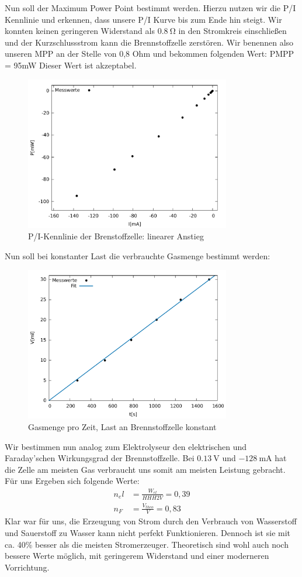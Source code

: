 Nun soll der Maximum Power Point bestimmt werden. Hierzu nutzen wir die P/I Kennlinie und erkennen, dass unsere P/I Kurve bis zum Ende hin steigt. Wir konnten keinen geringeren Widerstand als $\SI{0,8}{\ohm}$  in den Stromkreis einschließen und der Kurzschlussstrom kann die Brennstoffzelle zerstören. Wir benennen also unseren MPP an der Stelle von 0,8 Ohm und bekommen folgenden Wert: PMPP = 95mW 
Dieser Wert ist akzeptabel.
\begin{figure}[htbp]
	\centering
	\includegraphics[width=0.8\textwidth]{mess/aufg11.pdf}
	\caption{P/I-Kennlinie der Brenstoffzelle: linearer Anstieg}
	\label{a11}
\end{figure}

Nun soll bei konstanter Last die verbrauchte Gasmenge bestimmt werden:
\begin{figure}[htbp]
	\centering
	\includegraphics[width=0.8\textwidth]{mess/aufg12.pdf}
	\caption{Gasmenge pro Zeit, Last an Brennstoffzelle konstant}
	\label{a12}
\end{figure}
Wir bestimmen nun analog zum Elektrolyseur den elektrischen und Faraday’schen Wirkungsgrad der Brennstoffzelle.
Bei $\SI{0.13}{\volt}$ und $\SI{-128}{\milli \ampere}$ hat die Zelle am meisten Gas verbraucht uns somit am meisten Leistung gebracht. Für uns Ergeben sich folgende Werte:
\begin{align*}
n_el &= \frac{W_{el}}{HHH2V}=0,39 \\
n_F &= \frac{V_{theo}}{V}=0,83
\end{align*}
Klar war für uns, die Erzeugung von Strom durch den Verbrauch von Wasserstoff und Sauerstoff zu Wasser kann nicht perfekt Funktionieren. Dennoch ist sie mit ca. 40\% besser als die meisten Stromerzeuger. Theoretisch sind wohl auch noch bessere Werte möglich, mit geringerem Widerstand und einer moderneren Vorrichtung.
